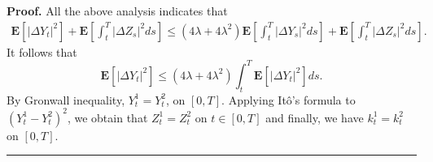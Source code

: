 \documentclass[10pt]{article}%
\numberwithin{equation}{section}
\newtheorem{remark}[theorem]{Remark}
\newenvironment{proof}[1][Proof]{\noindent \textbf{#1.} }{\  \rule{0.5em}{0.5em}}
\begin{document}
\begin{proof}
   All the above analysis indicates that 
 \begin{equation}
    \begin{split}
       \mathbf{E}\left[\left|\Delta Y_t\right|^2\right]+\mathbf{E}\left[\int_{t}^{T}\left|\Delta Z_s\right|^2ds\right]
      \leq  (4\lambda+4\lambda^2)\mathbf{E}\left[\int_{t}^{T}\left|\Delta Y_s \right|^2 ds\right]+\mathbf{E}\left[\int_{t}^{T}\left|\Delta Z_s\right|^2ds\right].%
    \end{split}
    \end{equation}
It follows that 
\begin{equation*}  
\mathbf{E}\left[|\Delta Y_t|^2\right]\leq (4\lambda+4\lambda^2)\int_{t}^{T}\mathbf{E}\left[|\Delta Y_t|^2\right]ds.
\end{equation*}
By Gronwall inequality, $Y^1_t=Y^2_t$, on $[0,T]$. Applying It\^{o}'s formula to $(Y^1_t-Y^2_t)^2$, we obtain that $Z^1_t=Z^2_t$ on $t\in[0,T]$ and finally, we have $k^1_t=k^2_t$ on $[0,T]$.
\end{proof}
\end{document}
